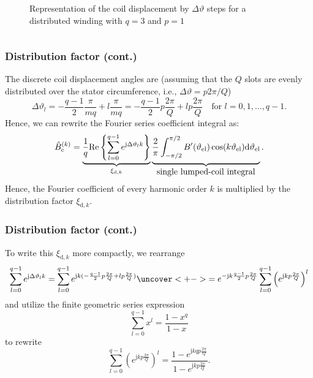 \begin{frame}
\begin{columns}
\begin{column}{0.4\textwidth}
\begin{figure}
                \caption{Representation of the coil displacement by $\Delta \vartheta$ steps for a distributed winding with $q=3$ and $p=1$}
                \label{fig:MMF_single_phase_distributed}
            \end{figure}
        \end{column}
    \end{columns}
\end{frame}

\begin{frame}
	\frametitle{Distribution factor  (cont.)}
   The discrete coil displacement angles are (assuming that the $Q$ slots are evenly distributed over the stator circumference, i.e., $\Delta \vartheta = p 2  \pi/Q$)
   \begin{equation}
    \Delta\vartheta_l = -\frac{q-1}{2} \frac{\pi}{m q} + l \frac{\pi}{m q} = -\frac{q-1}{2} p \frac{2\pi}{Q} + l p \frac{2\pi}{Q} \quad \mbox{for } l=0,1,\ldots,q-1.
   \end{equation}\pause
   Hence, we can rewrite the Fourier series coefficient integral as:
   \begin{equation}
    \hat{B}_{\mathrm{c}}^{(k)} = \underbrace{\frac{1}{q}\mathrm{Re}\left\{\sum_{l=0}^{q-1} e^{\mathrm{j} \Delta\vartheta_l k}\right\} }_{\xi_{\mathrm{d},k}} \underbrace{\frac{2}{\pi}\int_{-\pi/2}^{\pi/2} B'(\vartheta_\mathrm{el}) \cos(k \vartheta_\mathrm{el}) \mathrm{d}\vartheta_\mathrm{el} \vphantom{\sum_{l=0}^{q-1}}}_{\mbox{single lumped-coil integral}}.
    \label{eq:B_single_phase_coil_fourier_series_coefficients_distributed}
\end{equation}
Hence, the Fourier coefficient of every harmonic order $k$ is multiplied by the distribution factor $\xi_{\mathrm{d},k}$. 
\end{frame}

\begin{frame}
	\frametitle{Distribution factor  (cont.)}
    \onslide<+->
    To write this $\xi_{\mathrm{d},k}$ more compactly, we rearrange 
    \begin{equation}
        \sum_{l=0}^{q-1} e^{\mathrm{j} \Delta\vartheta_l k} = \sum_{l=0}^{q-1} e^{\mathrm{j} k (-\frac{q-1}{2} p \frac{2\pi}{Q} + l p \frac{2\pi}{Q})} \uncover<+->{= e^{- \mathrm{j} k \frac{q-1}{2} p \frac{2\pi}{Q}} \sum_{l=0}^{q-1} \left(e^{\mathrm{j} k  p \frac{2\pi}{Q}}\right)^l}
        \label{eq:sum_exp_distribution_factor}
    \end{equation}
    \onslide<+->
    and utilize the finite geometric series expression
    $$
    \sum_{l=0}^{q-1} x^l = \frac{1-x^q}{1-x}
    $$
    \onslide<+->
    to rewrite
    $$
    \sum_{l=0}^{q-1} \left(e^{\mathrm{j} k  p \frac{2\pi}{Q}}\right)^l = \frac{1-e^{\mathrm{j} k q p \frac{2\pi}{Q}}}{1-e^{\mathrm{j} k  p \frac{2\pi}{Q}}}.
    $$
\end{frame}

